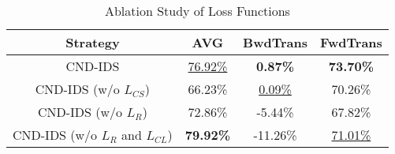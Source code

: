 \begin{table}[]
\caption{Ablation Study of \Design{} Loss Functions}
\label{tab:ablation_loss}
\centering
\begin{tabular}{|c|c|c|c|}
\hline
Strategy                         & AVG              & BwdTrans        & FwdTrans         \\ \hline
CND-IDS                          &\underline{76.92\%}    & \textbf{0.87\%} & \textbf{73.70\%} \\ \hline
CND-IDS (w/o $L_{CS}$)           & 66.23\%          & \underline{0.09\%}    & 70.26\%          \\ \hline
CND-IDS (w/o $L_R$)              & 72.86\%          & -5.44\%         & 67.82\%          \\ \hline
CND-IDS (w/o $L_R$ and $L_{CL}$) & \textbf{79.92\%} & -11.26\%        & \underline{71.01\%}    \\ \hline
\end{tabular}
\end{table}

